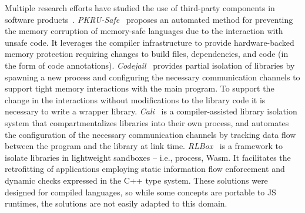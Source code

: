 Multiple research efforts have studied the use of third-party
components in software products~\cite{RLBox, kirth2022pkru,
  wu2012codejail, cali}. {\em PKRU-Safe}~\cite{kirth2022pkru} proposes an
automated method for preventing the memory corruption of memory-safe
languages due to the interaction with unsafe code. It leverages the
compiler infrastructure to provide hardware-backed memory protection
requiring changes to build files, dependencies, and code (in the form
of code annotations). {\em Codejail}~\cite{wu2012codejail} provides
partial isolation of libraries by spawning a new process and
configuring the necessary communication channels to support tight
memory interactions with the main program. To support the change in
the interactions without modifications to the library code it is
necessary to write a wrapper library.
{\em Cali}~\cite{cali} is a compiler-assisted library
isolation system that compartmentalizes libraries into their own
process, and automates the configuration of the necessary
communication channels by tracking data flow between the program and
the library at link time.
{\em RLBox}~\cite{RLBox} is a
framework to isolate libraries in lightweight sandboxes -- i.e.,
process, Wasm. It facilitates the retrofitting of applications
employing static information flow enforcement and dynamic checks
expressed in the C++ type system. These solutions were designed for
compiled languages, so while some concepts are portable to JS
runtimes, the solutions are not easily adapted to this domain.

